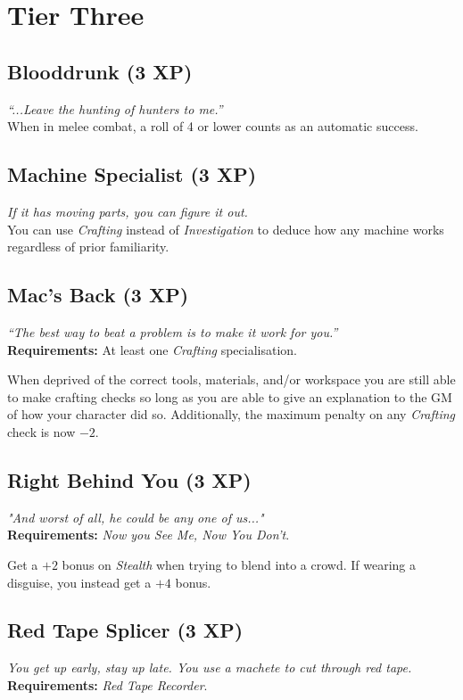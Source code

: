 \section{Tier Three}

\subsection*{Blooddrunk (3 XP)}
\textit{``...Leave the hunting of hunters to me.''}\\
When in melee combat, a roll of 4 or lower counts as an automatic success.

\subsection*{Machine Specialist (3 XP)}
\textit{If it has moving parts, you can figure it out.}\\
You can use \textit{Crafting} instead of \textit{Investigation} to deduce how any machine works regardless of prior familiarity.

\subsection*{Mac's Back (3 XP)}
\textit{``The best way to beat a problem is to make it work for you.''}\\
\textbf{Requirements:} At least one \textit{Crafting} specialisation.

When deprived of the correct tools, materials, and/or workspace you are still able to make crafting checks so long as you are able to give an explanation to the GM of how your character did so.
Additionally, the maximum penalty on any \textit{Crafting} check is now $-2$.

\subsection*{Right Behind You (3 XP)}
\textit{"And worst of all, he could be any one of us..."}\\
\textbf{Requirements:} \textit{Now you See Me, Now You Don't}.

Get a $+2$ bonus on \textit{Stealth} when trying to blend into a crowd.
If wearing a disguise, you instead get a $+4$ bonus.

\subsection*{Red Tape Splicer (3 XP)}
\textit{You get up early, stay up late. You use a machete to cut through red tape.}\\
\textbf{Requirements:} \textit{Red Tape Recorder}.

